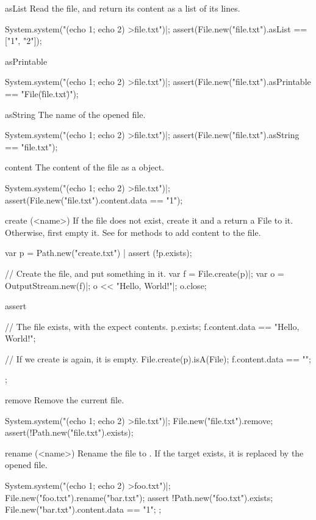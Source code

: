 \begin{urbiscriptapi}
\item[asList]
  Read the file, and return its content as a list of its lines.
\begin{urbiscript}
System.system("(echo 1; echo 2) >file.txt")|;
assert(File.new("file.txt").asList == ["1", "2"]);
\end{urbiscript}

\item[asPrintable]
\begin{urbiscript}
System.system("(echo 1; echo 2) >file.txt")|;
assert(File.new("file.txt").asPrintable == "File(\"file.txt\")");
\end{urbiscript}

\item[asString]
  The name of the opened file.
\begin{urbiscript}
System.system("(echo 1; echo 2) >file.txt")|;
assert(File.new("file.txt").asString == "file.txt");
\end{urbiscript}

\item[content]
  The content of the file as a  object.
\begin{urbiscript}
System.system("(echo 1; echo 2) >file.txt")|;
assert(File.new("file.txt").content.data == "1\n");
\end{urbiscript}

\item[create](<name>)%
  If the file  does not exist, create it and a return a File to
  it.  Otherwise, first empty it.  See  for methods
  to add content to the file.
\begin{urbiscript}
var p = Path.new("create.txt") |
assert (!p.exists);

// Create the file, and put something in it.
var f = File.create(p)|;
var o = OutputStream.new(f)|;
o << "Hello, World!"|;
o.close;

assert
{
  // The file exists, with the expect contents.
  p.exists;
  f.content.data == "Hello, World!";

  // If we create is again, it is empty.
  File.create(p).isA(File);
  f.content.data == "";
};
\end{urbiscript}

\item[remove]
  Remove the current file.
\begin{urbiscript}
System.system("(echo 1; echo 2) >file.txt")|;
File.new("file.txt").remove;
assert(!Path.new("file.txt").exists);
\end{urbiscript}

\item[rename](<name>)%
  Rename the file to .  If the target exists, it is replaced by
  the opened file.
\begin{urbiscript}
System.system("(echo 1; echo 2) >foo.txt")|;
File.new("foo.txt").rename("bar.txt");
assert
{
  !Path.new("foo.txt").exists;
  File.new("bar.txt").content.data == "1\n";
};
\end{urbiscript}


\end{urbiscriptapi}


